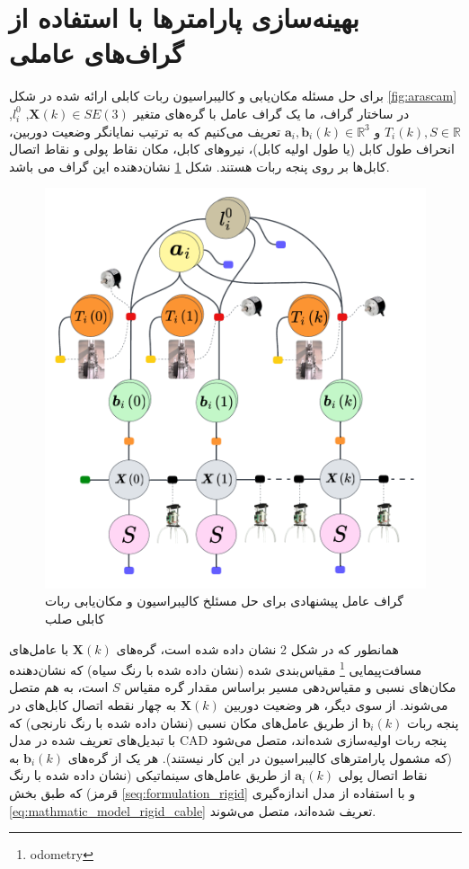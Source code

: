 \section{بهینه‌سازی پارامترها با استفاده از گراف‌های عاملی} \label{seq:factor_graph_for_rigid_cable}

برای حل مسئله مکان‌یابی و کالیبراسیون ربات کابلی ارائه شده در شکل
\ref{fig:arascam}
در ساختار گراف، ما یک گراف عامل با گره‌های متغیر 
$\boldsymbol{X}(k) \in SE(3)$,
$l_{i}^0$,
$T_i(k), S \in \mathbb{R}$ 
و
$\boldsymbol{a}_i, \boldsymbol{b}_i(k) \in \mathbb{R}^3$ 
تعریف می‌کنیم که به ترتیب نمایانگر وضعیت دوربین، انحراف طول کابل (یا طول اولیه کابل)، نیرو‌های کابل، مکان نقاط پولی و نقاط اتصال کابل‌ها بر روی پنجه ربات هستند. شکل 
\ref{fig:rigidcable_factorgraph}
نشان‌دهنده این گراف می باشد. 

\begin{figure}[hb]
	\centering
	\includegraphics[width=0.7\linewidth]{img/rigidcable_factorgraph}
	\caption{گراف عامل پیشنهادی برای حل مسئلخ کالیبراسیون و مکان‌یابی ربات کابلی صلب}
	\label{fig:rigidcable_factorgraph}
\end{figure}


همانطور که در شکل 2 نشان داده شده است، گره‌های
$\boldsymbol{X}(k)$
با عامل‌های مسافت‌پیمایی
\footnote{odometry}
 مقیاس‌بندی شده (نشان داده شده با رنگ سیاه) که نشان‌دهنده مکان‌های نسبی و مقیاس‌دهی مسیر براساس مقدار گره مقیاس 
$S$
 است، به هم متصل می‌شوند. از سوی دیگر، هر وضعیت دوربین 
$\boldsymbol{X}(k)$
 به چهار نقطه اتصال کابل‌های در پنجه ربات
$\boldsymbol{b}_i(k)$
از طریق عامل‌های مکان نسبی (نشان داده شده با رنگ نارنجی) که با تبدیل‌های تعریف شده در مدل CAD پنجه ربات اولیه‌سازی شده‌اند، متصل می‌شود (که مشمول پارامترهای کالیبراسیون در این کار نیستند). هر یک از گره‌های
$\boldsymbol{b}_i(k)$
به نقاط اتصال پولی
$\boldsymbol{a}_i(k)$
از طریق عامل‌های سینماتیکی (نشان داده شده با رنگ قرمز) که طبق بخش 
\ref{seq:formulation_rigid}
 و با استفاده از مدل اندازه‌گیری
\ref{eq:mathmatic_model_rigid_cable}
تعریف شده‌اند، متصل می‌شوند.

